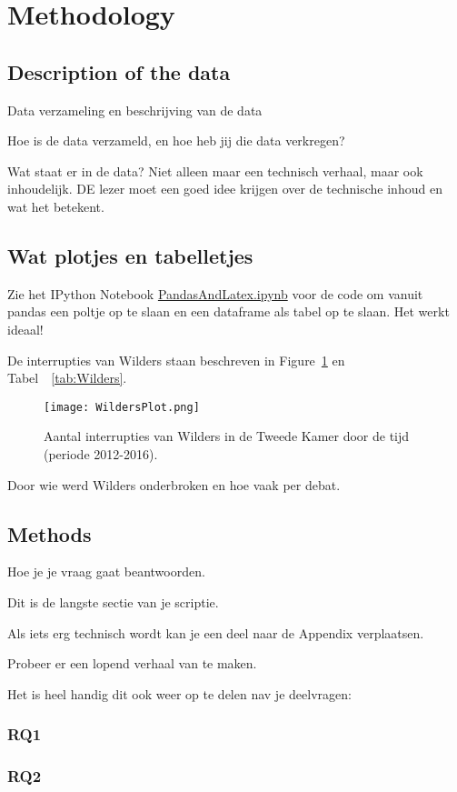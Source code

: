 \section{Methodology}
\label{sec:meth}


\subsection{Description of the data}
Data verzameling en beschrijving van de data

Hoe is de data verzameld, en hoe heb jij die data verkregen?


Wat staat er in de data? Niet alleen maar een technisch verhaal, maar ook inhoudelijk. DE lezer moet een goed idee krijgen over de technische inhoud en wat het betekent.

\pagebreak
\subsection{Wat plotjes en tabelletjes}

Zie het IPython Notebook \url{PandasAndLatex.ipynb} voor de code om vanuit pandas een poltje op te slaan en een dataframe als tabel op te slaan. Het werkt ideaal! 

De interrupties van Wilders staan beschreven in Figure~\ref{fig:wilders} en Tabel~~\ref{tab:Wilders}.


\begin{figure}
\begin{center}
\texttt{[image: WildersPlot.png]}
\caption{\label{fig:wilders} Aantal interrupties van Wilders in de Tweede Kamer door de tijd (periode 2012-2016).}
\end{center}
\end{figure}


\pagebreak

\begin{table}[h]
\begin{footnotesize}

\end{footnotesize}
\caption{\label{tab:Wilders} Door wie werd Wilders onderbroken en hoe vaak per debat.}
\end{table}


\pagebreak
\subsection{Methods}
Hoe je je vraag gaat beantwoorden.


Dit is de langste sectie van je scriptie. 

Als iets erg technisch wordt kan je een deel naar de Appendix verplaatsen. 

Probeer er een lopend verhaal van te maken.

Het is heel handig dit ook weer op te delen nav je deelvragen:

\subsubsection{RQ1}

\subsubsection{RQ2}
